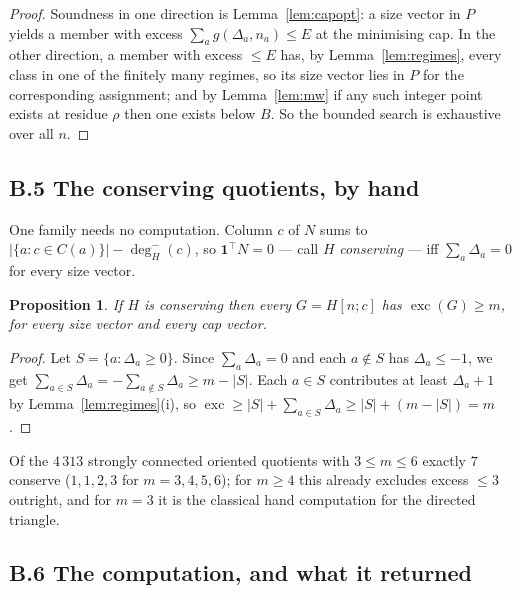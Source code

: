 \documentclass[11pt]{amsart}
\newtheorem{proposition}[theorem]{Proposition}
\theoremstyle{remark}
\newcommand{\exc}{\operatorname{exc}}
\begin{document}
\begin{proof}
Soundness in one direction is Lemma~\ref{lem:capopt}: a size vector in $P$
yields a member with excess $\sum_a g(\Delta_a, n_a) \le E$ at the minimising
cap. In the other direction, a member with excess $\le E$ has, by
Lemma~\ref{lem:regimes}, every class in one of the finitely many regimes, so
its size vector lies in $P$ for the corresponding assignment; and by
Lemma~\ref{lem:mw} if any such integer point exists at residue $\rho$ then one
exists below $B$. So the bounded search is exhaustive over all $n$.
\end{proof}

\subsection*{B.5 The conserving quotients, by hand}

One family needs no computation. Column $c$ of $N$ sums to
$|\{a : c \in C(a)\}| - \deg^-_H(c)$, so
$\mathbf{1}^{\!\top} N = 0$ --- call $H$ \emph{conserving} --- iff
$\sum_a \Delta_a = 0$ for every size vector.

\begin{proposition}
If $H$ is conserving then every $G = H[n;c]$ has $\exc(G) \ge m$, for every
size vector and every cap vector.
\end{proposition}

\begin{proof}
Let $S = \{a : \Delta_a \ge 0\}$. Since $\sum_a \Delta_a = 0$ and each
$a \notin S$ has $\Delta_a \le -1$, we get
$\sum_{a \in S} \Delta_a = -\sum_{a \notin S} \Delta_a \ge m - |S|$. Each
$a \in S$ contributes at least $\Delta_a + 1$ by Lemma~\ref{lem:regimes}(i),
so $\exc \ge |S| + \sum_{a \in S} \Delta_a \ge |S| + (m - |S|) = m$.
\end{proof}

Of the $4\,313$ strongly connected oriented quotients with $3 \le m \le 6$
exactly $7$ conserve ($1, 1, 2, 3$ for $m = 3,4,5,6$); for $m \ge 4$ this
already excludes excess $\le 3$ outright, and for $m = 3$ it is the classical
hand computation for the directed triangle.

\subsection*{B.6 The computation, and what it returned}
\end{document}
